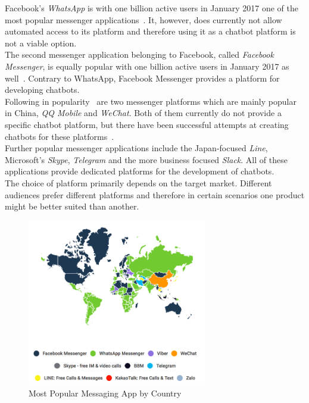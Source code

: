 Facebook's \emph{WhatsApp} is with one billion active users in January 2017 one of the most popular messenger applications~\cite{fbpopular}.
It, however, does currently not allow automated access to its platform and therefore using it as a chatbot platform is not a viable option.
\\

The second messenger application belonging to Facebook, called \emph{Facebook Messenger}, is equally popular with one billion active users in January 2017 as well~\cite{fbpopular}.
Contrary to WhatsApp, Facebook Messenger provides a platform for developing chatbots.
\\

Following in popularity~\cite{appusage} are two messenger platforms which are mainly popular in China, \emph{QQ Mobile} and \emph{WeChat}.
Both of them currently do not provide a specific chatbot platform,
but there have been successful attempts at creating chatbots for these platforms~\cite{wechatbot}.
\\

Further popular messenger applications include the Japan-focused \emph{Line}, Microsoft's \emph{Skype}, \emph{Telegram} and the more business focused \emph{Slack}.
All of these applications provide dedicated platforms for the development of chatbots.
\\

The choice of platform primarily depends on the target market.
Different audiences prefer different platforms and therefore in certain scenarios one product might be better suited than another.

\begin{figure}[H]
	\centering
	\includegraphics[width=0.7\textwidth]{images/similarweb-messenger-by-country.png}
	\caption{Most Popular Messaging App by Country~\cite{similarweb}}
	\label{fig:similarweb}
\end{figure}

